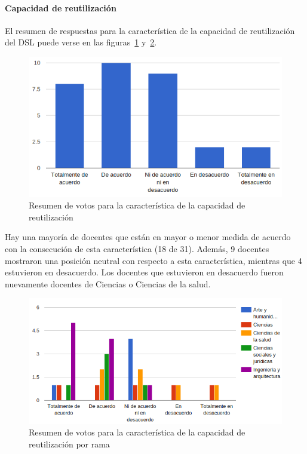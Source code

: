 \newpage
\paragraph*{Capacidad de reutilización}

El resumen de respuestas para la característica de la capacidad de reutilización del DSL puede verse en las figuras~\ref{fig:evalmetodo:dsl:reutilizable} y~\ref{fig:evalmetodo:dsl:reutilizable:rama}.

\begin{figure}[h]
  \begin{center}
    \includegraphics[scale=0.5]{C_DSL_reutilizable.png}
  \end{center}
  \caption{Resumen de votos para la característica de la capacidad de reutilización}
  \label{fig:evalmetodo:dsl:reutilizable}
\end{figure}

Hay una mayoría de docentes que están en mayor o menor medida de acuerdo con la consecución de esta característica (18 de 31). Además, 9 docentes mostraron una posición neutral con respecto a esta característica, mientras que 4 estuvieron en desacuerdo. Los docentes que estuvieron en desacuerdo fueron nuevamente docentes de Ciencias o Ciencias de la salud.

\begin{figure}[h]
  \begin{center}
    \includegraphics[scale=0.5]{C_DSL_reutilizable_rama.png}
  \end{center}
  \caption{Resumen de votos para la característica de la capacidad de reutilización por rama}
  \label{fig:evalmetodo:dsl:reutilizable:rama}
\end{figure}

